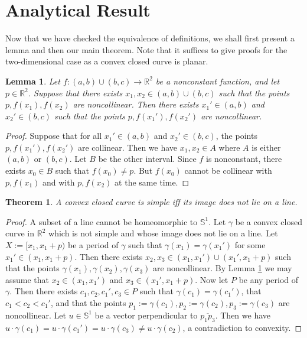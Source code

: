 \documentclass{amsart}
\newtheorem{lemma}[proposition]{Lemma}
\newtheorem{theorem}[proposition]{Theorem}
\theoremstyle{definition}
\theoremstyle{remark}
\begin{document}
\section{Analytical Result}

Now that we have checked the equivalence of definitions,
we shall first present a lemma and then our main theorem.
Note that it suffices to give proofs for the two-dimensional case
as a convex closed curve is planar.

\begin{lemma}
    \label{lem}
    Let $f:(a,b)\cup(b,c)\to\mathbb{R}^2$ be a
    nonconstant function, and let $p\in\mathbb{R}^2$.
    Suppose that there exists $x_1,x_2\in(a,b)\cup(b,c)$ such that
    the points $p,f(x_1),f(x_2)$ are noncollinear.
    Then there exists $x_1'\in(a,b)$ and $x_2'\in(b,c)$ such that
    the points $p,f(x_1'),f(x_2')$ are noncollinear.
\end{lemma}

\begin{proof}
    Suppose that for all $x_1'\in(a,b)$ and $x_2'\in(b,c)$,
    the points $p,f(x_1'),f(x_2')$ are collinear.
    Then we have $x_1,x_2\in A$ where
    $A$ is either $(a,b)$ or $(b,c)$. Let $B$ be the other interval.
    Since $f$ is nonconstant, there exists $x_0\in B$
    such that $f(x_0)\ne p$. But $f(x_0)$ cannot be collinear
    with $p,f(x_1)$ and with $p,f(x_2)$ at the same time.
\end{proof}

\begin{theorem}
    \label{thm:main}
    A convex closed curve is simple iff its image does not lie on a line.
\end{theorem}

\begin{proof}
    A subset of a line cannot be homeomorphic to $\mathbb{S}^1$.
    Let $\gamma$ be a convex closed curve in $\mathbb{R}^2$
    which is not simple and whose image does not lie on a line.
    Let $X:=[x_1,x_1+p)$ be a period of $\gamma$ such that
    $\gamma(x_1)=\gamma(x_1')$ for some $x_1'\in(x_1,x_1+p)$.
    Then there exists $x_2,x_3\in(x_1,x_1')\cup(x_1',x_1+p)$
    such that the points $\gamma(x_1),\gamma(x_2),\gamma(x_3)$ are
    noncollinear. By Lemma \ref{lem} we may assume that
    $x_2\in(x_1,x_1')$ and $x_3\in(x_1',x_1+p)$.
    Now let $P$ be any period of $\gamma$. Then there exists
    $c_1,c_2,c_1',c_3\in P$ such that $\gamma(c_1)=\gamma(c_1')$,
    that $c_1<c_2<c_1'$, and that the points
    $p_1:=\gamma(c_1),p_2:=\gamma(c_2),p_3:=\gamma(c_3)$ are noncollinear.
    Let $u\in\mathbb{S}^1$ be a vector perpendicular to
    $\overline{p_1p_3}$. Then we have
    $u\cdot\gamma(c_1)=u\cdot\gamma(c_1')=u\cdot\gamma(c_3)
        \ne u\cdot\gamma(c_2)$, a contradiction to convexity.
\end{proof}
\end{document}
